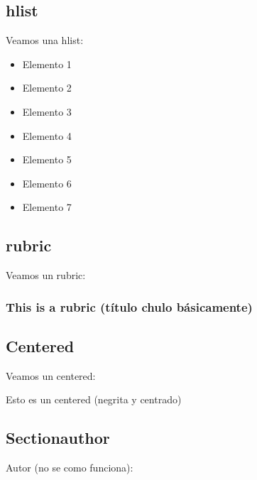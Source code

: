 \documentclass[letterpaper,10pt,english]{jupyterBook}
\begin{document}
\subsection{hlist}
\label{\detokenize{docs/02_04_Mas_cosas:hlist}}
\sphinxAtStartPar
Veamos una hlist:
\begin{multicols}{3}\raggedright
\begin{itemize}\setlength{\itemsep}{0pt}\setlength{\parskip}{0pt}
\item {} 
\sphinxAtStartPar
Elemento 1

\item {} 
\sphinxAtStartPar
Elemento 2

\item {} 
\sphinxAtStartPar
Elemento 3

\item {} 
\sphinxAtStartPar
Elemento 4

\item {} 
\sphinxAtStartPar
Elemento 5

\item {} 
\sphinxAtStartPar
Elemento 6

\item {} 
\sphinxAtStartPar
Elemento 7

\end{itemize}\raggedcolumns\end{multicols}


\subsection{rubric}
\label{\detokenize{docs/02_04_Mas_cosas:rubric}}
\sphinxAtStartPar
Veamos un rubric:
\subsubsection*{This is a rubric (título chulo básicamente)}


\subsection{Centered}
\label{\detokenize{docs/02_04_Mas_cosas:centered}}
\sphinxAtStartPar
Veamos un centered:

\begin{center}Esto es un centered (negrita y centrado)
\end{center}

\subsection{Sectionauthor}
\label{\detokenize{docs/02_04_Mas_cosas:sectionauthor}}
\sphinxAtStartPar
Autor (no se como funciona):
\end{document}
